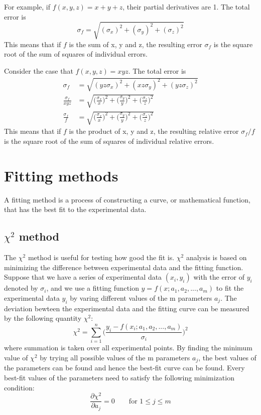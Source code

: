 \documentclass[12pt,a4paper]{report}
\begin{document}
For example, if $f(x,y,z) = x+y+z$, their partial derivatives are 1. The total error is
\begin{equation}
\sigma_{f} = \sqrt{( \sigma_x )^2 + ( \sigma_y )^2+ ( \sigma_z )^2}
\end{equation}
 This means that if $f$ is the sum of x, y and z, the resulting error $\sigma_{f}$ is the square root of the sum of squares of individual errors.
 
Consider the case that $f(x,y,z) = xyz$. The total error is
\begin{align}
\sigma_{f} &= \sqrt{( yz \sigma_x )^2 + ( xz \sigma_y )^2+ ( yz \sigma_z )^2} \\
\frac{ \sigma_{f} }{xyz} &= \sqrt{ \Big( \frac{\sigma_x}{x} \Big)^2 + \Big( \frac{\sigma_y}{y} \Big)^2 + \Big( \frac{\sigma_z}{z} \Big)^2} \\
\frac{ \sigma_{f} }{f} &= \sqrt{ \Big( \frac{\sigma_x}{x} \Big)^2 + \Big( \frac{\sigma_y}{y} \Big)^2 + \Big( \frac{\sigma_z}{z} \Big)^2}
\end{align}
This means that if $f$ is the product of x, y and z, the resulting relative error $\sigma_{f}/f$ is the square root of the sum of squares of individual relative errors.

\section{Fitting methods}
A fitting method is a process of constructing a curve, or mathematical function, that has the best fit to the experimental data.
\subsection{$\chi^2$ method}
The $\chi^2$ method is useful for testing how good the fit is.
$\chi^2$ analysis \cite{stat_2, BAKER1984437, reduced_chi_squared} is based on minimizing the difference between experimental data and the fitting function. Suppose that we have a series of experimental data $(x_i,y_i)$ with the error of $y_i$ denoted by $\sigma_i$, and we use a fitting function $y = f(x;a_1,a_2,...,a_m)$ to fit the experimental data $y_i$ by varing different values of the m parameters $a_j$. The deviation bewteen the experimental data and the fitting curve can be measured by the following quantity $\chi^2$:
\begin{equation} \label{chi_square_formula}
\chi^2 = \sum_{i = 1}^{n} \Big ( \frac{y_i - f(x_i;a_1,a_2,...,a_m)}{\sigma_i} \Big )^2
\end{equation}
where summation is taken over all experimental points.
By finding the minimum value of $\chi^2$ by trying all possible values of the m parameters $a_j$, the best values of the parameters can be found and hence the best-fit curve can be found.
Every best-fit values of the parameters need to satisfy the following minimization condition:
\begin{equation} \label{chi_minimisation_condition}
\frac{\partial \chi^2}{\partial a_j} = 0 \qquad \text{for } 1 \leq  j \leq m
\end{equation}
\end{document}
